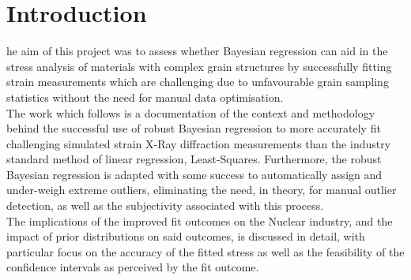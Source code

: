%
%
\let\textcircled=\pgftextcircled
\chapter{Introduction}
\label{chap:intro}

he aim of this project was to assess whether Bayesian regression can aid in the stress analysis of materials with complex grain structures by successfully fitting strain measurements which are challenging due to unfavourable grain sampling statistics without the need for manual data optimisation. \\

The work which follows is a documentation of the context and methodology behind the successful use of robust Bayesian regression to more accurately fit challenging simulated strain X-Ray diffraction measurements than the industry standard method of linear regression, Least-Squares. Furthermore, the robust Bayesian regression is adapted with some success to automatically assign and under-weigh extreme outliers, eliminating the need, in theory, for manual outlier detection, as well as the subjectivity associated with this process. \\

The implications of the improved fit outcomes on the Nuclear industry, and the impact of prior distributions on said outcomes, is discussed in detail, with particular focus on the accuracy of the fitted stress as well as the feasibility of the confidence intervals as perceived by the fit outcome. \\

